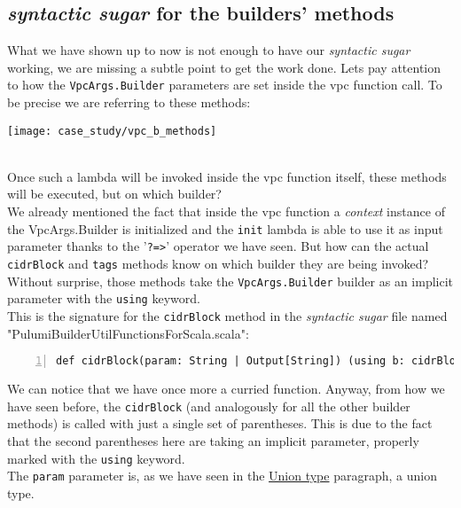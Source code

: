 \subsection{\textit{syntactic sugar} for the builders' methods}
\label{ssec:syn-sug-builders}
What we have shown up to now is not enough to have our \textit{syntactic sugar} working, we are missing a subtle point to get the work done.
Lets pay attention to how the \texttt{VpcArgs.Builder} parameters are set inside the vpc function call.
To be precise we are referring to these methods:
\begin{center}
  \texttt{[image: case\_study/vpc\_b\_methods]} 
\end{center}\mbox{}\\
Once such a lambda will be invoked inside the vpc function itself, these methods will be executed, but on which builder?\\
We already mentioned the fact that inside the vpc function a \textit{context} instance of the VpcArgs.Builder is initialized and the \texttt{init} lambda is able to use it as input parameter thanks to the '\texttt{?=>}' operator we have seen.
But how can the actual \texttt{cidrBlock} and \texttt{tags} methods know on which builder they are being invoked?\\
Without surprise, those methods take the \texttt{VpcArgs.Builder} builder as an implicit parameter with the \texttt{using} keyword.\\
This is the signature for the \texttt{cidrBlock} method in the \textit{syntactic sugar} file named "PulumiBuilderUtilFunctionsForScala.scala":\\
\begin{minipage}{\linewidth}
\begin{lstlisting}[numbers=left, numberstyle=\tiny, numbersep=-5pt, stepnumber=1, linewidth=420pt]
  def cidrBlock(param: String | Output[String]) (using b: cidrBlockOwners): Unit
\end{lstlisting}
\end{minipage}
We can notice that we have once more a curried function.
Anyway, from how we have seen before, the \texttt{cidrBlock} (and analogously for all the other builder methods) is called with just a single set of parentheses.
This is due to the fact that the second parentheses here are taking an implicit parameter, properly marked with the \texttt{using} keyword.\\
The \texttt{param} parameter is, as we have seen in the \hyperref[sssec:union]{Union type} paragraph, a union type.
